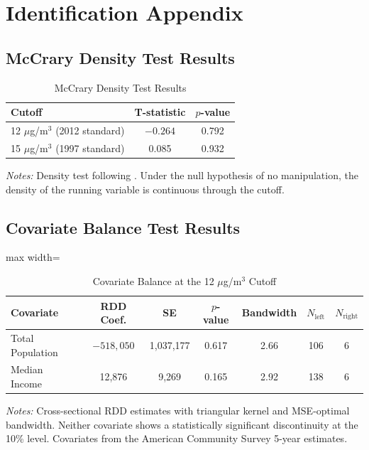 \documentclass[12pt]{article}
\begin{document}
\section{Identification Appendix}
\label{app:identification}

\subsection{McCrary Density Test Results}

\begin{table}[H]
\centering
\caption{McCrary Density Test Results}
\begin{tabular}{lcc}
\toprule
Cutoff & T-statistic & $p$-value \\
\midrule
12 $\mu$g/m$^3$ (2012 standard) & $-0.264$ & 0.792 \\
15 $\mu$g/m$^3$ (1997 standard) & 0.085 & 0.932 \\
\bottomrule
\end{tabular}
\begin{tablenotes}
\small
\item \textit{Notes:} Density test following \citet{cattaneo2020simple}. Under the null hypothesis of no manipulation, the density of the running variable is continuous through the cutoff.
\end{tablenotes}
\end{table}

\subsection{Covariate Balance Test Results}

\begin{table}[H]
\centering
\caption{Covariate Balance at the 12 $\mu$g/m$^3$ Cutoff}
\label{tab:balance}
\begin{adjustbox}{max width=\textwidth}
\begin{tabular}{lcccccc}
\toprule
Covariate & RDD Coef. & SE & $p$-value & Bandwidth & $N_{\text{left}}$ & $N_{\text{right}}$ \\
\midrule
Total Population & $-518{,}050$ & 1,037,177 & 0.617 & 2.66 & 106 & 6 \\
Median Income & 12,876 & 9,269 & 0.165 & 2.92 & 138 & 6 \\
\bottomrule
\end{tabular}
\end{adjustbox}
\begin{tablenotes}
\small
\item \textit{Notes:} Cross-sectional RDD estimates with triangular kernel and MSE-optimal bandwidth. Neither covariate shows a statistically significant discontinuity at the 10\% level. Covariates from the American Community Survey 5-year estimates.
\end{tablenotes}
\end{table}
\end{document}
